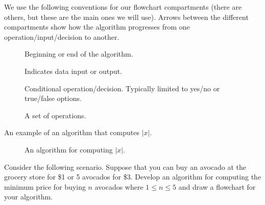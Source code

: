 \documentclass{ximera}
\begin{document}
We use the following conventions for our flowchart compartments (there are others, but these are the main ones we will use). Arrows between the different compartments show how the algorithm progresses from one operation/input/decision to another.

\begin{figure}[!ht]
	\centering
	\caption{Beginning or end of the algorithm.}
\end{figure}

\begin{figure}[!ht]
	\centering
	\caption{Indicates data input or output.}
\end{figure}

\begin{figure}[!ht]
	\centering
	\caption{Conditional operation/decision. Typically limited to yes/no or true/false options.}
\end{figure}

\begin{figure}[!ht]
	\centering
	\caption{A set of operations.}
\end{figure}

An example of an algorithm that computes $|x|$.

\begin{figure}[!ht]
	\centering
	\caption{An algorithm for computing $|x|$.}
\end{figure}

Consider the following scenario. Suppose that you can buy an avocado at the grocery store for \$1 or 5 avocados for \$3. Develop an algorithm for computing the minimum price for buying $n$ avocados where $1\leq n\leq 5$ and draw a flowchart for your algorithm.
\end{document}
